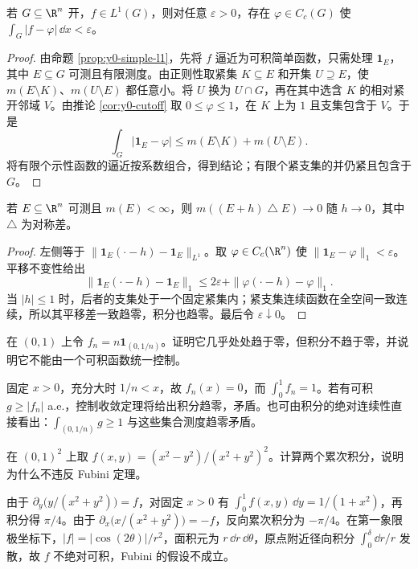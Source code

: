 \begin{theorem}\label{thm:y0-cc-density}
若 $G\subseteq\R^n$ 开，$f\in L^1(G)$，则对任意 $\varepsilon>0$，存在 $\varphi\in C_c(G)$ 使 $\int_G|f-\varphi|\,\dd x<\varepsilon$。
\end{theorem}
\begin{proof}
由命题 \ref{prop:y0-simple-l1}，先将 $f$ 逼近为可积简单函数，只需处理 $\mathbf1_E$，其中 $E\subseteq G$ 可测且有限测度。由正则性取紧集 $K\subseteq E$ 和开集 $U\supseteq E$，使 $m(E\setminus K)$、$m(U\setminus E)$ 都任意小。将 $U$ 换为 $U\cap G$，再在其中选含 $K$ 的相对紧开邻域 $V$。由推论 \ref{cor:y0-cutoff} 取 $0\le\varphi\le1$，在 $K$ 上为 $1$ 且支集包含于 $V$。于是
\[
 \int_G|\mathbf1_E-\varphi|
 \le m(E\setminus K)+m(U\setminus E).
\]
将有限个示性函数的逼近按系数组合，得到结论；有限个紧支集的并仍紧且包含于 $G$。
\end{proof}

\begin{theorem}[有限测度集的平移连续性]\label{thm:y0-translation-set}
若 $E\subseteq\R^n$ 可测且 $m(E)<\infty$，则 $m((E+h)\mathbin{\triangle}E)\to0$ 随 $h\to0$，其中 $\triangle$ 为对称差。
\end{theorem}
\begin{proof}
左侧等于 $\|\mathbf1_E(\cdot-h)-\mathbf1_E\|_{L^1}$。取 $\varphi\in C_c(\R^n)$ 使 $\|\mathbf1_E-\varphi\|_1<\varepsilon$。平移不变性给出
\[
 \|\mathbf1_E(\cdot-h)-\mathbf1_E\|_1
 \le2\varepsilon+\|\varphi(\cdot-h)-\varphi\|_1.
\]
当 $|h|\le1$ 时，后者的支集处于一个固定紧集内；紧支集连续函数在全空间一致连续，所以其平移差一致趋零，积分也趋零。最后令 $\varepsilon\downarrow0$。
\end{proof}

\begin{exercise}[逐点收敛与积分收敛]
在 $(0,1)$ 上令 $f_n=n\mathbf1_{(0,1/n)}$。证明它几乎处处趋于零，但积分不趋于零，并说明它不能由一个可积函数统一控制。
\end{exercise}
\begin{solution}
固定 $x>0$，充分大时 $1/n<x$，故 $f_n(x)=0$，而 $\int_0^1f_n=1$。若有可积 $g\ge|f_n|$ a.e.，控制收敛定理将给出积分趋零，矛盾。也可由积分的绝对连续性直接看出：$\int_{(0,1/n)}g\ge1$ 与这些集合测度趋零矛盾。
\end{solution}

\begin{exercise}[非绝对可积时累次积分可以不同]
在 $(0,1)^2$ 上取 $f(x,y)=(x^2-y^2)/(x^2+y^2)^2$。计算两个累次积分，说明为什么不违反 Fubini 定理。
\end{exercise}
\begin{solution}
由于 $\partial_y\bigl(y/(x^2+y^2)\bigr)=f$，对固定 $x>0$ 有 $\int_0^1f(x,y)\,\dd y=1/(1+x^2)$，再积分得 $\pi/4$。由于 $\partial_x\bigl(x/(x^2+y^2)\bigr)=-f$，反向累次积分为 $-\pi/4$。在第一象限极坐标下，$|f|=|\cos(2\theta)|/r^2$，面积元为 $r\,\dd r\,\dd\theta$，原点附近径向积分 $\int_0^\delta\dd r/r$ 发散，故 $f$ 不绝对可积，Fubini 的假设不成立。
\end{solution}
